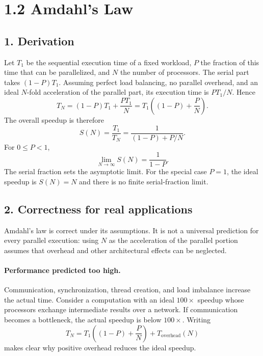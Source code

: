\documentclass[11pt,a4paper]{article}
\begin{document}
\newpage
\section*{1.2 Amdahl's Law}
\subsection*{1. Derivation}
Let $T_1$ be the sequential execution time of a fixed workload, $P$ the fraction
of this time that can be parallelized, and $N$ the number of processors.
The serial part takes $(1-P)T_1$. Assuming perfect load balancing, no parallel
overhead, and an ideal $N$-fold acceleration of the parallel part, its execution
time is $PT_1/N$. Hence
\begin{equation}
  T_N=(1-P)T_1+\frac{PT_1}{N}
     =T_1\left((1-P)+\frac{P}{N}\right).
\end{equation}
The overall speedup is therefore
\begin{equation}
  \boxed{S(N)=\frac{T_1}{T_N}=\frac{1}{(1-P)+P/N}}.
  \label{eq:law}
\end{equation}
For $0\leq P<1$,
\begin{equation}
  \lim_{N\to\infty}S(N)=\frac{1}{1-P}.
\end{equation}
The serial fraction sets the asymptotic limit. For the special case $P=1$,
the ideal speedup is $S(N)=N$ and there is no finite serial-fraction limit.

\subsection*{2. Correctness for real applications}
Amdahl's law is correct under its assumptions. It is not a universal prediction
for every parallel execution: using $N$ as the acceleration of the parallel
portion assumes that overhead and other architectural effects can be neglected.

\paragraph{Performance predicted too high.}
Communication, synchronization, thread creation, and load imbalance increase
the actual time. Consider a computation with an ideal $100\times$ speedup
whose processors exchange intermediate results
over a network. If communication becomes a bottleneck, the actual speedup
is below $100\times$. Writing
\[
  T_N=T_1\left((1-P)+\frac{P}{N}\right)+T_{\mathrm{overhead}}(N)
\]
makes clear why positive overhead reduces the ideal speedup.
\end{document}
